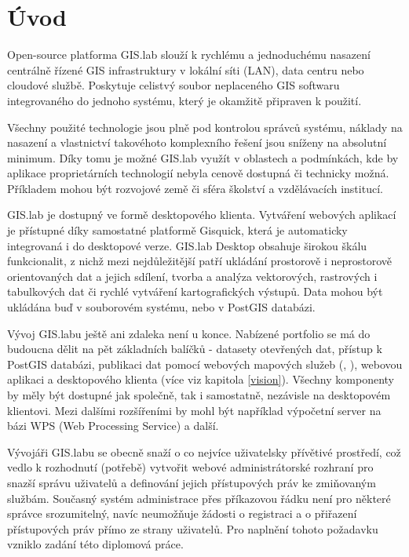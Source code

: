 \chapter{Úvod}
\label{1-uvod}


Open-source platforma GIS.lab slouží k rychlému a jednoduchému
nasazení centrálně řízené GIS infrastruktury v lokální síti (LAN),
data centru nebo cloudové službě. Poskytuje celistvý soubor
neplaceného GIS softwaru integrovaného do jednoho systému, který je
okamžitě připraven k použití.

Všechny použité technologie jsou plně pod kontrolou správců systému, náklady
na nasazení a vlastnictví takovéhoto komplexního řešení jsou sníženy
na absolutní minimum. Díky tomu je možné GIS.lab využít v oblastech a
podmínkách, kde by aplikace proprietárních technologií nebyla cenově dostupná či
technicky možná. Příkladem mohou být rozvojové země či sféra školství a vzdělávacích institucí.

GIS.lab je dostupný ve formě desktopového klienta. Vytváření webových aplikací je přístupné díky samostatné platformě Gisquick, která je automaticky integrovaná i do desktopové verze. GIS.lab
Desktop obsahuje širokou škálu funkcionalit, z nichž mezi nejdůležitější
patří ukládání prostorově i neprostorově orientovaných dat a jejich
sdílení, tvorba a analýza vektorových, rastrových i tabulkových dat
či rychlé vytváření kartografických výstupů. Data mohou být ukládána buď v souborovém systému, nebo v PostGIS databázi.

Vývoj GIS.labu ještě ani zdaleka není u konce. Nabízené portfolio se
má do budoucna dělit na pět základních balíčků - datasety otevřených dat, přístup k PostGIS
databázi, publikaci dat pomocí webových mapových služeb (,
), webovou aplikaci a desktopového klienta (více viz kapitola
\ref{vision}). Všechny komponenty by měly být dostupné jak společně, tak i samostatně, nezávisle na desktopovém klientovi. Mezi dalšími rozšířeními by mohl být například výpočetní server na bázi WPS (Web Processing Service) a další.

Vývojáři GIS.labu se obecně snaží o co nejvíce uživatelsky přívětivé
prostředí, což vedlo k rozhodnutí (potřebě) vytvořit webové
administrátorské rozhraní pro snazší správu uživatelů a definování
jejich přístupových práv ke zmiňovaným službám. Současný systém
administrace přes příkazovou řádku není pro některé správce
srozumitelný, navíc neumožňuje žádosti o registraci a o přiřazení
přístupových práv přímo ze strany uživatelů. Pro naplnění tohoto
požadavku vzniklo zadání této diplomová práce.

